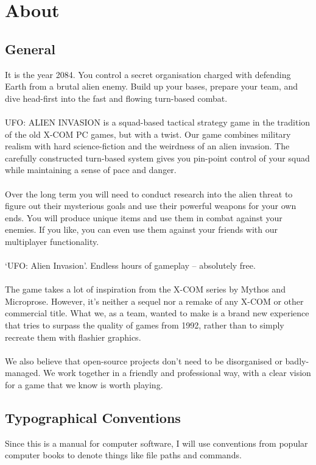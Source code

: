 

\section{About}
\subsection{General}
It is the year 2084. You control a secret organisation charged with defending Earth from a brutal alien enemy. Build up your bases, prepare your team, and dive head-first into the fast and flowing turn-based combat.\\
\\
UFO: ALIEN INVASION is a squad-based tactical strategy game in the tradition of the old X-COM PC games, but with a twist. Our game combines military realism with hard science-fiction and the weirdness of an alien invasion. The carefully constructed turn-based system gives you pin-point control of your squad while maintaining a sense of pace and danger.\\
\\
Over the long term you will need to conduct research into the alien threat to figure out their mysterious goals and use their powerful weapons for your own ends. You will produce unique items and use them in combat against your enemies. If you like, you can even use them against your friends with our multiplayer functionality.\\
\\
`UFO: Alien Invasion'. Endless hours of gameplay -- absolutely free.\\
\\
The game takes a lot of inspiration from the X-COM series by Mythos and Microprose. However, it's neither a sequel nor a remake of any X-COM or other commercial title. What we, as a team, wanted to make is a brand new experience that tries to surpass the quality of games from 1992, rather than to simply recreate them with flashier graphics.\\
\\
We also believe that open-source projects don't need to be disorganised or badly-managed. We work together in a friendly and professional way, with a clear vision for a game that we know is worth playing.

\subsection{Typographical Conventions}
Since this is a manual for computer software, I will use conventions from popular computer books to denote things like file paths and commands.

